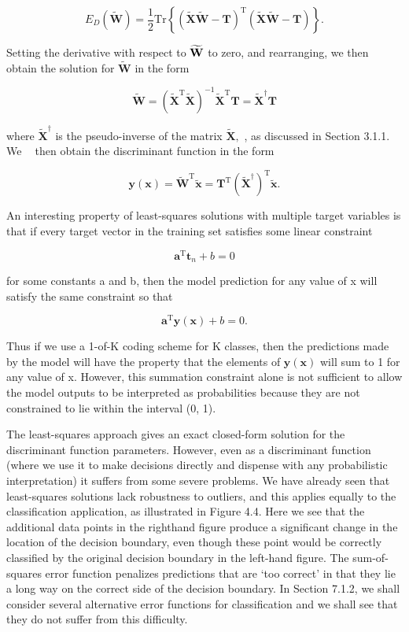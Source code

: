 \documentclass[
  10
]{article}
\begin{document}
\[
E _ {D} (\widetilde {\mathbf {W}}) = \frac {1}{2} \mathrm{Tr} \left\{(\widetilde {\mathbf {X}} \widetilde {\mathbf {W}} - \mathbf {T}) ^ {\mathrm{T}} (\widetilde {\mathbf {X}} \widetilde {\mathbf {W}} - \mathbf {T}) \right\}.\tag{4.15}
\]

Setting the derivative with respect to \(\widetilde { \bf W }\) to zero,
and rearranging, we then obtain the solution for
\(\widetilde { \mathbf { W } }\) in the form

\[
\widetilde {\mathbf {W}} = (\widetilde {\mathbf {X}} ^ {\mathrm{T}} \widetilde {\mathbf {X}}) ^ {- 1} \widetilde {\mathbf {X}} ^ {\mathrm{T}} \mathbf {T} = \widetilde {\mathbf {X}} ^ {\dagger} \mathbf {T}\tag{4.16}
\]

where \(\widetilde { \mathbf { X } } ^ { \dagger }\) is the
pseudo-inverse of the matrix \(\widetilde { \mathbf { X } } ,\) , as
discussed in Section 3.1.1. We  then obtain the discriminant function in
the form

\[
\mathbf {y} (\mathbf {x}) = \widetilde {\mathbf {W}} ^ {\mathrm{T}} \widetilde {\mathbf {x}} = \mathbf {T} ^ {\mathrm{T}} \left(\widetilde {\mathbf {X}} ^ {\dagger}\right) ^ {\mathrm{T}} \widetilde {\mathbf {x}}.\tag{4.17}
\]

An interesting property of least-squares solutions with multiple target
variables is that if every target vector in the training set satisfies
some linear constraint

\[
\mathbf {a} ^ {\mathrm{T}} \mathbf {t} _ {n} + b = 0\tag{4.18}
\]

for some constants a and b, then the model prediction for any value of x
will satisfy the same constraint so that

\[
\mathbf {a} ^ {\mathrm{T}} \mathbf {y} (\mathbf {x}) + b = 0.\tag{4.19}
\]

Thus if we use a 1-of-K coding scheme for K classes, then the
predictions made by the model will have the property that the elements
of \(\mathbf { y } ( \mathbf { x } )\) will sum to 1 for any value of x.
However, this summation constraint alone is not sufficient to allow the
model outputs to be interpreted as probabilities because they are not
constrained to lie within the interval (0, 1).

The least-squares approach gives an exact closed-form solution for the
discriminant function parameters. However, even as a discriminant
function (where we use it to make decisions directly and dispense with
any probabilistic interpretation) it suffers from some severe problems.
We have already seen that least-squares solutions lack robustness to
outliers, and this applies equally to the classification application, as
illustrated in Figure 4.4. Here we see that the additional data points
in the righthand figure produce a significant change in the location of
the decision boundary, even though these point would be correctly
classified by the original decision boundary in the left-hand figure.
The sum-of-squares error function penalizes predictions that are `too
correct' in that they lie a long way on the correct side of the decision
boundary. In Section 7.1.2, we shall consider several alternative error
functions for classification and we shall see that they do not suffer
from this difficulty.
\end{document}
